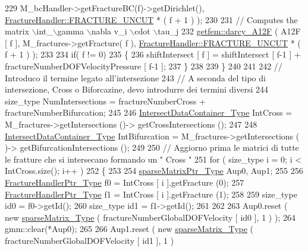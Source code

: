 \begin{DoxyCode}
229                              M\_bcHandler->getFractureBC(f)->getDirichlet(), 
      \hyperlink{classFractureHandler_a495ad4fc72d0c47c8f0424842f1153aaaa992cc3ad024a030ecd798dc319c95ac}{FractureHandler::FRACTURE\_UNCUT} * ( f + 1 ) );
230 
231         \textcolor{comment}{// Computes the matrix \(\backslash\)int\_\(\backslash\)gamma \(\backslash\)nabla v\_i \(\backslash\)cdot \(\backslash\)tau\_j}
232         \hyperlink{namespacegetfem_ab62aa98cfcf55810e1518906202cbedc}{getfem::darcy\_A12F} ( A12F [ f ], M\_fractures->getFracture( f ), 
      \hyperlink{classFractureHandler_a495ad4fc72d0c47c8f0424842f1153aaaa992cc3ad024a030ecd798dc319c95ac}{FractureHandler::FRACTURE\_UNCUT} * ( f + 1 ) );
233         
234         \textcolor{keywordflow}{if}( f != 0)
235         \{
236             shiftIntersect [ f ] = shiftIntersect [ f-1 ] + fractureNumberDOFVelocityPressure [ f-1 ];  
237         \}
238         
239       \}
240 
241     
242     \textcolor{comment}{// Introduco il termine legato all'intersezione}
243     \textcolor{comment}{// A seconda del tipo di intersezione, Cross o Biforcazine, devo introdurre dei termini diversi}
244     size\_type NumIntersections = fractureNumberCross + fractureNumberBifurcation;
245   
246     \hyperlink{IntersectData_8h_a822ec3b760dfb603e1cf0bfe3ad5636a}{IntersectDataContainer\_Type} IntCross = M\_fractures->getIntersections ()-> 
      getCrossIntersections ();
247     
248     \hyperlink{IntersectData_8h_a822ec3b760dfb603e1cf0bfe3ad5636a}{IntersectDataContainer\_Type} IntBifurcation = M\_fractures->getIntersections (
      )-> getBifurcationIntersections ();
249     
250     \textcolor{comment}{// Aggiorno prima le matrici di tutte le fratture che si intersecano formando un " Cross "}
251     \textcolor{keywordflow}{for} ( size\_type i = 0; i < IntCross.size(); i++ )
252     \{
253         
254         \hyperlink{Core_8h_a87137a9501b38c724ac80bc955164bb7}{sparseMatrixPtr\_Type} Aup0, Aup1;
255             
256         \hyperlink{FractureHandler_8h_af23fb7a30aaff864bd42587af4f1e78a}{FractureHandlerPtr\_Type} f0 = IntCross [ i ].getFracture (0);
257         \hyperlink{FractureHandler_8h_af23fb7a30aaff864bd42587af4f1e78a}{FractureHandlerPtr\_Type} f1 = IntCross [ i ].getFracture (1);
258         
259         size\_type id0 = f0->getId();
260         size\_type id1 = f1->getId();
261         
262         
263         Aup0.reset ( \textcolor{keyword}{new} \hyperlink{Core_8h_afba9f623673e2ae32054015bdb5500f9}{sparseMatrix\_Type} ( fractureNumberGlobalDOFVelocity [ id0 ], 1 ) 
      );
264         gmm::clear(*Aup0);
265 
266         Aup1.reset ( \textcolor{keyword}{new} \hyperlink{Core_8h_afba9f623673e2ae32054015bdb5500f9}{sparseMatrix\_Type} ( fractureNumberGlobalDOFVelocity [ id1 ], 1 ) 

\end{DoxyCode}
